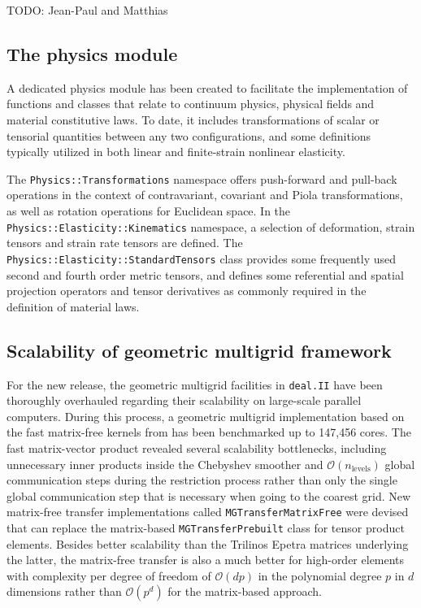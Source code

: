 \documentclass{ansarticle-preprint}
\newcommand{\specialword}[1]{\texttt{#1}}
\newcommand{\dealii}{{\specialword{deal.II}}}
\begin{document}
TODO: Jean-Paul and Matthias

\subsection{The physics module}

A dedicated physics module has been created to facilitate the implementation of functions and classes that relate to continuum physics, physical fields and material constitutive laws.
To date, it includes transformations of scalar or tensorial quantities between any two configurations, and some definitions typically utilized in both linear and finite-strain nonlinear elasticity.

The \verb!Physics::Transformations! namespace offers push-forward and pull-back operations in the context of contravariant, covariant and Piola transformations, as well as rotation operations for Euclidean space.
In the \verb!Physics::Elasticity::Kinematics! namespace, a selection of deformation, strain tensors and strain rate tensors are defined.
The \verb!Physics::Elasticity::StandardTensors! class provides some frequently used second and fourth order metric tensors, and defines some referential and spatial projection operators and tensor derivatives as commonly required in the definition of material laws.

\subsection{Scalability of geometric multigrid framework}

For the new release, the geometric multigrid facilities in \dealii{} have been
thoroughly overhauled regarding their scalability on large-scale parallel
computers. During this process, a geometric multigrid implementation based on
the fast matrix-free kernels from \cite{KronbichlerKormann2012} has been
benchmarked up to 147,456 cores. The fast matrix-vector product revealed
several scalability bottlenecks, including unnecessary inner products inside
the Chebyshev smoother and $\mathcal O(n_\text{levels})$ global communication
steps during the restriction process rather than only the single global
communication step that is necessary when going to the coarest grid. New
matrix-free transfer implementations called \texttt{MGTransferMatrixFree} were
devised that can replace the matrix-based \texttt{MGTransferPrebuilt} class
for tensor product elements. Besides better scalability than the Trilinos
Epetra matrices underlying the latter, the matrix-free transfer is also a much
better for high-order elements with complexity per degree of freedom of
$\mathcal O(d p)$ in the polynomial degree $p$ in $d$ dimensions rather than
$\mathcal O(p^d)$ for the matrix-based approach.
\end{document}
